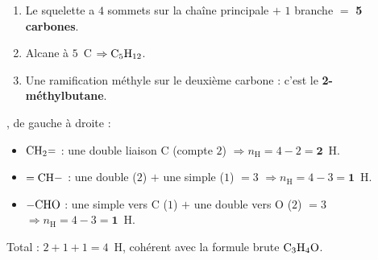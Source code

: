 \documentclass[11pt,a4paper]{article}
\begin{document}
\begin{corrige}
\begin{enumerate}[label=\alph*)]
  \item Le squelette a $4$ sommets sur la chaîne principale $+$ $1$ branche $=$ \textbf{5 carbones}.
  \item Alcane à $5$~C $\Rightarrow \ce{C5H12}$.
  \item Une ramification méthyle sur le deuxième carbone : c'est le \textbf{2-méthylbutane}.
\end{enumerate}
\end{corrige}

\begin{corrige}
, de gauche à droite :
\begin{itemize}[leftmargin=1.6em,itemsep=1pt]
  \item $\ce{CH2=}$ : une double liaison C (compte $2$) $\Rightarrow n_{\text{H}}=4-2=\textbf{2}$~H.
  \item $=\ce{CH}-$ : une double ($2$) $+$ une simple ($1$) $=3$ $\Rightarrow n_{\text{H}}=4-3=\textbf{1}$~H.
  \item $-\ce{CHO}$ : une simple vers C ($1$) $+$ une double vers O ($2$) $=3$ $\Rightarrow n_{\text{H}}=4-3=\textbf{1}$~H.
\end{itemize}
Total : $2+1+1=4$~H, cohérent avec la formule brute $\ce{C3H4O}$.
\end{corrige}
\end{document}
